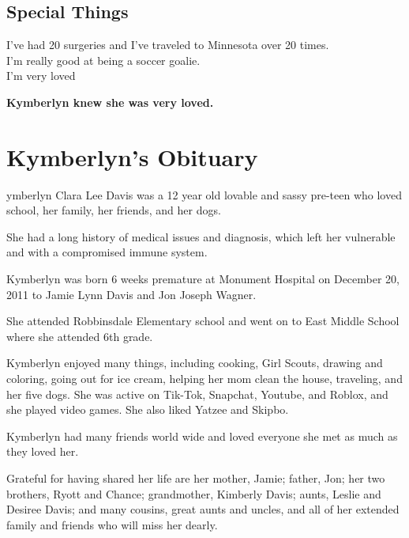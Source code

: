\documentclass[10pt]{report}
\newcommand{\fbd}{
    \setlength{\fboxsep}{0pt}
    \setlength{\fboxrule}{3pt}
  }
\begin{document}
\section*{Special Things}
I've had 20 surgeries and I've traveled to Minnesota over 20 times.\\
I'm really good at being a soccer goalie.\\
I'm very loved
\begin{center}
  {\fbd
    }

  \textbf{Kymberlyn knew she was very loved.}
\end{center}

\clearpage

\chapter*{Kymberlyn's Obituary}
\lettrine{}{  }
ymberlyn Clara Lee Davis was a 12 year old lovable and sassy pre-teen who loved
school, her family, her friends, and her dogs.  

She had a long history of medical issues and diagnosis,
which left her vulnerable and with a compromised immune system. 

Kymberlyn was born 6 weeks premature at Monument Hospital on December 20, 2011
to Jamie Lynn Davis and Jon Joseph Wagner. 

She attended Robbinsdale Elementary school and went on to East Middle School
where she attended 6th grade. 

Kymberlyn enjoyed many things, including cooking, Girl Scouts,
drawing and coloring, going out for ice cream, helping her mom clean the house,
traveling, and her five dogs. She was active on Tik-Tok, Snapchat, Youtube, and
Roblox, and she played video games. She also liked Yatzee and Skipbo. 

Kymberlyn had many friends world wide and loved everyone
she met as much as they loved her. 

Grateful for having shared her life are her mother, Jamie; 
father, Jon; her two brothers, Ryott and Chance; 
grandmother, Kimberly Davis; aunts, Leslie and Desiree Davis; 
and many cousins, great aunts and uncles, 
and all of her extended family and friends who will miss her dearly. 
\end{document}
